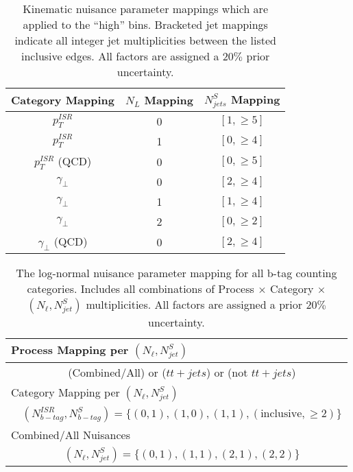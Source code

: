 \begin{table}
\centering
\caption{Kinematic nuisance parameter mappings which are applied to the ``high'' bins. Bracketed jet mappings indicate all integer jet multiplicities between the listed inclusive edges. All factors are assigned a $20\%$ prior uncertainty.}
\begin{tabular}{ccc}
\hline 
Category Mapping & $N_L$ Mapping & $N_{jets}^S$  Mapping \\ 
\hline 
\hline
$p_T^{ISR}$  & 0 & $[1,\geq5]$ \\ 
$p_T^{ISR}$ & 1 & $[0,\geq4]$ \\ 
$p_T^{ISR}$ (QCD) & 0 & $[0,\geq5]$ \\ 
$\gamma_\perp$ & 0 & $[2,\geq4]$ \\ 
$\gamma_\perp$ & 1 & $[1,\geq4]$ \\ 
$\gamma_\perp$ & 2 & $[0,\geq2]$ \\  
$\gamma_\perp$ (QCD) & 0 & $[2,\geq4]$ \\ 
\hline 
\end{tabular} 
\label{tab:kinnuisance}
\end{table}


\begingroup

\begin{table}
\centering
\caption{The log-normal nuisance parameter mapping for all b-tag counting categories. Includes all combinations of Process $\times$ Category $\times$ $(N_\ell,N_{jet}^S)$ multiplicities. All factors are assigned a prior $20\%$ uncertainty.}
\setlength{\tabcolsep}{10pt} %
\renewcommand{\arraystretch}{1.5} %
\begin{tabular}{lc}

\multicolumn{2}{|l}{Process Mapping per $(N_\ell,N_{jet}^S)$ } \\ 
\hline 
 & (Combined/All) or ($tt+jets$) or (not $tt+jets$)  \\ 
\multicolumn{2}{|l}{Category Mapping per $(N_\ell,N_{jet}^S)$ } \\ 
\hline 
 & $(N_{b-tag}^{ISR},N_{b-tag}^S)=\{(0,1),(1,0),(1,1),( \text{inclusive} ,\geq2) \}$ \\ 
\multicolumn{2}{|l}{Combined/All Nuisances}  \\ 
\hline 
 & $(N_\ell,N_{jet}^S)=\{(0,1),(1,1),(2,1),(2,2) \}$ \\ 

\end{tabular} 
\label{tab:btagnuisance}
\end{table}
\endgroup

